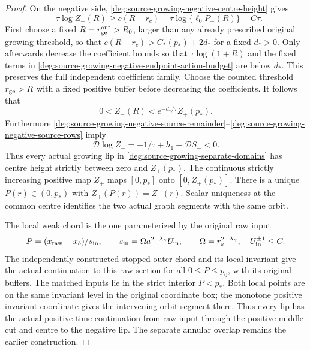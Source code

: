 \begin{proof}
On the negative side, \eqref{deg:source-growing-negative-centre-height} gives
\begin{equation}
 -\tau\log Z_-(R)\ge
 c(R-r_c)-\tau\log\{\ell_0P_-(R)\}-C\tau .
 \label{deg:source-growing-negative-endpoint-action-budget}
\end{equation}
First choose a fixed \(R=r_{\rm ge}^{\rm out}>R_0\), larger than any
already prescribed original growing threshold, so that
\(c(R-r_c)>C_*(p_*)+2d_*\) for a fixed \(d_*>0\).
Only afterwards decrease the coefficient bounds so that
\(\tau\log(1+R)\) and the fixed terms in \eqref{deg:source-growing-negative-endpoint-action-budget} are below
\(d_*\).  This preserves the full independent coefficient
family.
Choose the counted threshold \(r_{\rm ge}>R\) with a fixed
positive buffer before decreasing the coefficients. It follows that
\begin{equation}
 0<Z_-(R)<e^{-d_*/\tau}Z_+(p_*).
 \label{deg:source-growing-positive-image-inclusion}
\end{equation}
Furthermore \eqref{deg:source-growing-negative-source-remainder}--\eqref{deg:source-growing-negative-source-rows} imply
\begin{equation}
 \mathcal D\log Z_-=-1/\tau+h_1+\mathcal DS_-<0 .
 \label{deg:source-growing-negative-centre-order}
\end{equation}
Thus every actual growing lip in \eqref{deg:source-growing-separate-domains} has centre height
strictly between zero and \(Z_+(p_*)\).
The continuous strictly increasing positive map \(Z_+\)
maps \([0,p_*]\) onto \([0,Z_+(p_*)]\).
There is a unique \(P(r)\in(0,p_*)\) with
\(Z_+(P(r))=Z_-(r)\).
Scalar uniqueness at the common centre identifies the two
actual graph segments with the same orbit.

The local weak chord is the one parameterized by the original
raw input
\begin{equation}
 P=(x_{\rm raw}-x_b)/s_{\rm in},\qquad
 s_{\rm in}=\Omega a^{2-\lambda_\gamma}U_{\rm in},\qquad
 \Omega=r_s^{2-\lambda_\gamma},\quad U_{\rm in}^{\pm1}\le C.
 \label{deg:source-growing-positive-raw-input-scale}
\end{equation}
The independently constructed stopped outer chord and its
local invariant give the actual continuation to this raw
section for all \(0\le P\le p_0\), with its original buffers.
The matched inputs lie in the strict interior \(P<p_*\).
Both local points are on the same invariant level in the
original coordinate box; the monotone positive invariant
coordinate gives the intervening orbit segment there.
Thus every lip has the actual positive-time continuation from raw
input through the positive middle cut and centre to the negative lip.
The separate annular overlap remains the earlier construction.


\end{proof}

